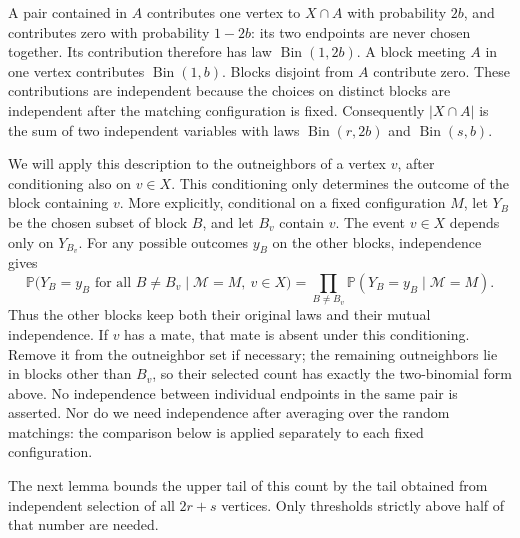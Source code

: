 \documentclass[10pt,a4paper]{article}
\DeclareMathOperator{\Bin}{Bin}
\newcommand{\Pp}{\mathbb P}
\newcommand{\abs}[1]{|#1|}
\begin{document}
A pair contained in \(A\) contributes one vertex to \(X\cap A\) with probability \(2b\), and contributes zero with probability \(1-2b\): its two endpoints are never chosen together. Its contribution therefore has law \(\Bin(1,2b)\). A block meeting \(A\) in one vertex contributes \(\Bin(1,b)\). Blocks disjoint from \(A\) contribute zero. These contributions are independent because the choices on distinct blocks are independent after the matching configuration is fixed. Consequently \(\abs{X\cap A}\) is the sum of two independent variables with laws \(\Bin(r,2b)\) and \(\Bin(s,b)\).

We will apply this description to the outneighbors of a vertex \(v\), after conditioning also on \(v\in X\). This conditioning only determines the outcome of the block containing \(v\). More explicitly, conditional on a fixed configuration \(M\), let \(Y_B\) be the chosen subset of block \(B\), and let \(B_v\) contain \(v\). The event \(v\in X\) depends only on \(Y_{B_v}\). For any possible outcomes \(y_B\) on the other blocks, independence gives
\[
\Pp\bigl(Y_B=y_B\text{ for all }B\ne B_v\mid\mathcal M=M,\ v\in X\bigr)
=\prod_{B\ne B_v}\Pp(Y_B=y_B\mid\mathcal M=M).
\]
Thus the other blocks keep both their original laws and their mutual independence. If \(v\) has a mate, that mate is absent under this conditioning. Remove it from the outneighbor set if necessary; the remaining outneighbors lie in blocks other than \(B_v\), so their selected count has exactly the two-binomial form above. No independence between individual endpoints in the same pair is asserted. Nor do we need independence after averaging over the random matchings: the comparison below is applied separately to each fixed configuration.

The next lemma bounds the upper tail of this count by the tail obtained from independent selection of all \(2r+s\) vertices. Only thresholds strictly above half of that number are needed.
\end{document}
